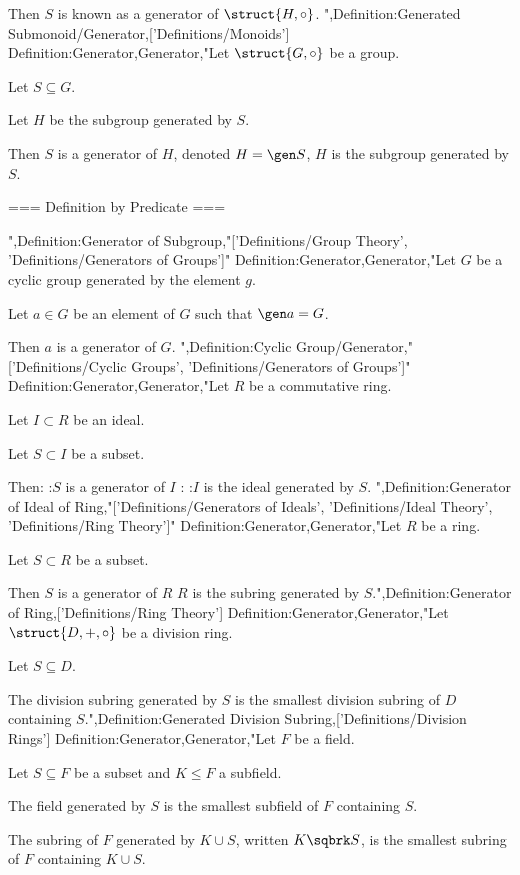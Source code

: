 Then $S$ is known as a generator of $\struct {H, \circ}$.
",Definition:Generated Submonoid/Generator,['Definitions/Monoids']
Definition:Generator,Generator,"Let $\struct {G, \circ}$ be a group.

Let $S \subseteq G$.

Let $H$ be the subgroup generated by $S$.


Then $S$ is a generator of $H$, denoted $H = \gen S$,  $H$ is the subgroup generated by $S$.


=== Definition by Predicate ===

",Definition:Generator of Subgroup,"['Definitions/Group Theory', 'Definitions/Generators of Groups']"
Definition:Generator,Generator,"Let $G$ be a cyclic group generated by the element $g$.

Let $a \in G$ be an element of $G$ such that $\gen a = G$.

Then $a$ is a generator of $G$.
",Definition:Cyclic Group/Generator,"['Definitions/Cyclic Groups', 'Definitions/Generators of Groups']"
Definition:Generator,Generator,"Let $R$ be a commutative ring. 

Let $I \subset R$ be an ideal.

Let $S \subset I$ be a subset.


Then:
:$S$ is a generator of $I$
:
:$I$ is the ideal generated by $S$.
",Definition:Generator of Ideal of Ring,"['Definitions/Generators of Ideals', 'Definitions/Ideal Theory', 'Definitions/Ring Theory']"
Definition:Generator,Generator,"Let $R$ be a ring.

Let $S \subset R$ be a subset.


Then $S$ is a generator of $R$  $R$ is the subring generated by $S$.",Definition:Generator of Ring,['Definitions/Ring Theory']
Definition:Generator,Generator,"Let $\struct {D, +, \circ}$ be a division ring.

Let $S \subseteq D$.


The division subring generated by $S$ is the smallest division subring of $D$ containing $S$.",Definition:Generated Division Subring,['Definitions/Division Rings']
Definition:Generator,Generator,"Let $F$ be a field.

Let $S \subseteq F$ be a subset and $K \le F$ a subfield.


The field generated by $S$ is the smallest subfield of $F$ containing $S$.

The subring of $F$ generated by $K \cup S$, written $K \sqbrk S$, is the smallest subring of $F$ containing $K \cup S$.

